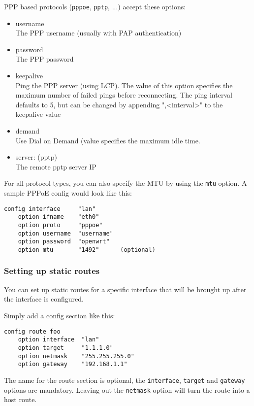PPP based protocols (\texttt{pppoe}, \texttt{pptp}, ...) accept these options:
\begin{itemize}
    \item{username} \\
        The PPP username (usually with PAP authentication)
    \item{password} \\
        The PPP password
    \item{keepalive} \\
        Ping the PPP server (using LCP). The value of this option
        specifies the maximum number of failed pings before reconnecting.
        The ping interval defaults to 5, but can be changed by appending
        ",<interval>" to the keepalive value
    \item{demand} \\
        Use Dial on Demand (value specifies the maximum idle time.
    \item{server: (pptp)} \\
        The remote pptp server IP
\end{itemize}

For all protocol types, you can also specify the MTU by using the \texttt{mtu} option.
A sample PPPoE config would look like this:

\begin{Verbatim}
config interface     "lan"
    option ifname    "eth0"
    option proto     "pppoe"
    option username  "username"
    option password  "openwrt"
    option mtu       "1492"      (optional)
\end{Verbatim}

\subsubsection{Setting up static routes}

You can set up static routes for a specific interface that will be brought up 
after the interface is configured.

Simply add a config section like this:

\begin{Verbatim}
config route foo
	option interface  "lan"
	option target     "1.1.1.0"
	option netmask    "255.255.255.0"
	option gateway    "192.168.1.1"
\end{Verbatim}

The name for the route section is optional, the \texttt{interface}, \texttt{target} and 
\texttt{gateway} options are mandatory.
Leaving out the \texttt{netmask} option will turn the route into a host route.

